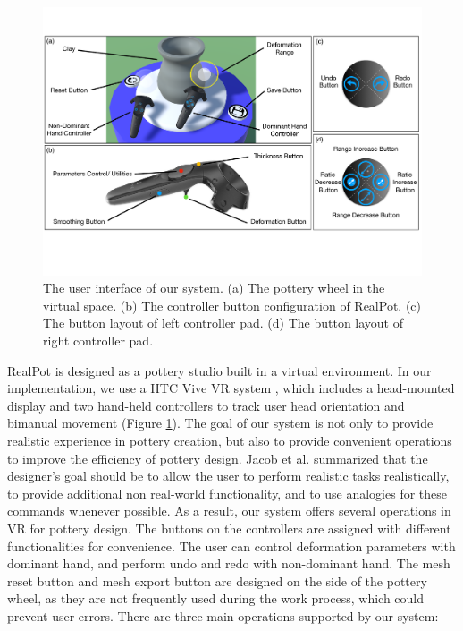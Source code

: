 \documentclass{svjour3}                     %
\begin{document}
\begin{figure}
\includegraphics[width=\textwidth]{fig9}
\caption{The user interface of our system. (a) The pottery wheel in the virtual space. (b) The controller button configuration of RealPot. (c) The button layout of left controller pad. (d) The button layout of right controller pad.}
\label{fig:ui}
\end{figure}

RealPot is designed as a pottery studio built in a virtual environment. In our implementation, we use a HTC Vive VR system \cite{website:vive}, which includes a head-mounted display and two hand-held controllers to track user head orientation and bimanual movement (Figure \ref{fig:ui}).
The goal of our system is not only to provide realistic experience in pottery creation, but also to provide convenient operations to improve the efficiency of pottery design. 
Jacob et al. \cite{Jacob2008Reality} summarized that the designer's goal should be to allow the user to perform realistic tasks realistically, to provide additional non real-world functionality, and to use analogies for these commands whenever possible.
As a result, our system offers several operations in VR for pottery design.
The buttons on the controllers are assigned with different functionalities for convenience. The user can control deformation parameters with dominant hand, and perform undo and redo with non-dominant hand.
The mesh reset button and mesh export button are designed on the side of the pottery wheel, as they are not frequently used during the work process, which could prevent user errors.
There are three main operations supported by our system:
\end{document}
